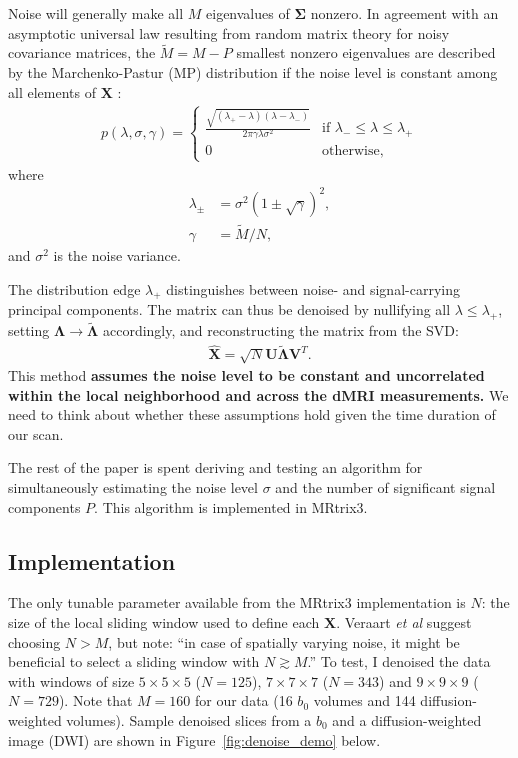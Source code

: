\documentclass{article}
\begin{document}
Noise will generally make all $M$ eigenvalues of $\bm{\Sigma}$ nonzero. In
agreement with an asymptotic universal law resulting from random matrix theory
for noisy covariance matrices, the $\tilde{M} = M - P$ smallest nonzero
eigenvalues are described by the Marchenko-Pastur (MP) distribution if the noise
level is constant among all elements of $\bm{X}$ \cite{Marchenko1967}:
\begin{align}
  p(\lambda, \sigma, \gamma) =
  \begin{cases}
    \frac{\sqrt{(\lambda_+ - \lambda)(\lambda - \lambda_-)}}{2\pi\gamma\lambda\sigma^2} & \text{if } \lambda_- \le \lambda \le \lambda_+\\
    0 & \text{otherwise,}
  \end{cases}
\end{align}
where
\begin{align}
  \lambda_{\pm} &= \sigma^2(1 \pm \sqrt{\gamma})^2,\\
  \gamma &= \tilde{M} / N,
\end{align}
and $\sigma^2$ is the noise variance.

The distribution edge $\lambda_+$ distinguishes between noise- and
signal-carrying principal components. The matrix can thus be denoised by
nullifying all $\lambda \le \lambda_+$, setting
$\bm{\Lambda}\rightarrow\tilde{\bm{\Lambda}}$ accordingly, and reconstructing
the matrix from the SVD:
\begin{align}
  \hat{\bm{X}} = \sqrt{N}\bm{U}\tilde{\bm{\Lambda}}\bm{V}^T.
\end{align}
This method \textbf{assumes the noise level to be constant and uncorrelated within
  the local neighborhood and across the dMRI measurements.} We need to think
about whether these assumptions hold given the time duration of our scan. 

The rest of the paper is spent deriving and testing an algorithm for
simultaneously estimating the noise level $\sigma$ and the number of significant
signal components $P$. This algorithm is implemented in MRtrix3. 

\subsection{Implementation}
The only tunable parameter available from the MRtrix3 implementation is $N$: the
size of the local sliding window used to define each $\bm{X}$. Veraart
\textit{et al} suggest choosing $N > M$, but note: ``in case of spatially
varying noise, it might be beneficial to select a sliding window with
$N \gtrsim M$.'' To test, I denoised the data with windows of size
$5 \times 5 \times 5$ ($N = 125$), $7 \times 7 \times 7$ ($N = 343$) and
$9 \times 9 \times 9$ ($N = 729$). Note that $M=160$ for our data (16 $b_0$
volumes and 144 diffusion-weighted volumes). Sample denoised slices from a $b_0$
and a diffusion-weighted image (DWI) are shown in Figure~\ref{fig:denoise_demo}
below.
\end{document}
